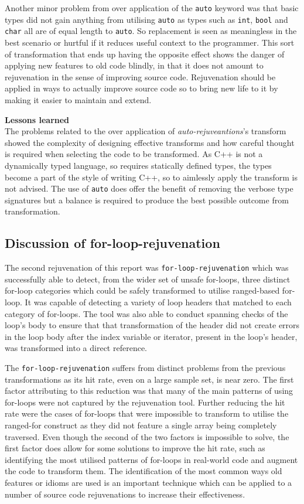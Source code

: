 \documentclass[bsc,frontabs,singlespacing,twoside,parskip,deptreport]{infthesis}
\begin{document}
Another minor problem from over application of the \texttt{auto} keyword was that basic types did not gain anything from utilising \texttt{auto} as types such as \texttt{int}, \texttt{bool} and \texttt{char} all are of equal length to \texttt{auto}. So replacement is seen as meaningless in the best scenario or hurtful if it reduces useful context to the programmer. This sort of transformation that ends up having the opposite effect shows the danger of applying new features to old code blindly, in that it does not amount to rejuvenation in the sense of improving source code. Rejuvenation should be applied in ways to actually improve source code so to bring new life to it by making it easier to maintain and extend. 

\textbf{Lessons learned}\\
The problems related to the over application of \textit{auto-rejuveantions}'s transform showed the complexity of designing effective transforms and how careful thought is required when selecting the code to be transformed. As C++ is not a dynamically typed language, so requires statically defined types, the types become a part of the style of writing C++, so to aimlessly apply the transform is not advised. The use of \texttt{auto} does offer the benefit of removing the verbose type signatures but a balance is required to produce the best possible outcome from transformation. 

\subsection{Discussion of for-loop-rejuvenation}
The second rejuvenation of this report was \texttt{for-loop-rejuvenation} which was successfully able to detect, from the wider set of unsafe for-loops, three distinct for-loop categories which could be safely transformed to utilise ranged-based for-loop. It was capable of detecting a variety of loop headers that matched to each category of for-loops. The tool was also able to conduct spanning checks of the loop's body to ensure that that transformation of the header did not create errors in the loop body after the index variable or iterator, present in the loop's header, was transformed into a direct reference.  

The \texttt{for-loop-rejuvenation} suffers from distinct problems from the previous transformations as its hit rate, even on a large sample set, is near zero. The first factor attributing to this reduction was that many of the main patterns of using for-loops were not captured by the rejuvenation tool. Further reducing the hit rate were the cases of for-loops that were impossible to transform to utilise the ranged-for construct as they did not feature a single array being completely traversed. Even though the second of the two factors is impossible to solve, the first factor does allow for some solutions to improve the hit rate, such as identifying the most utilised patterns of for-loops in real-world code and augment the code to transform them. The identification of the most common ways old features or idioms are used is an important technique which can be applied to a number of source code rejuvenations to increase their effectiveness.
\end{document}
